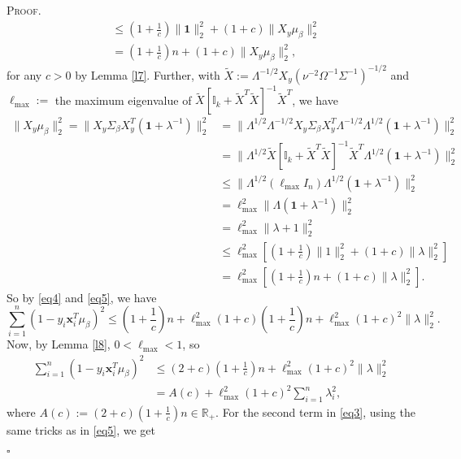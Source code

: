 \documentclass[12pt]{article}
\newcounter{ProofCounter}
\newenvironment{Proof}{\stepcounter{ProofCounter}\textsc{Proof.}}{\hfill$\square$}
\numberwithin{equation}{section}
\begin{document}
\begin{Proof}
\begin{align}
    & \leq \left(1 + \frac{1}{c}\right) \|\mathbf{1}\|_{2}^{2} + \left( 1 + c \right)\|X_{y}\mu_{\beta}\|_{2}^{2} \nonumber \\
    & = \left( 1 + \frac{1}{c} \right) n + (1 + c)\|X_y \mu_\beta \|_2^2,
    \label{eq4}
  \end{align}
  for any $c > 0$ by Lemma \ref{l7}. Further, with $\tilde{X} := \Lambda^{-1/2}X_{y}(\nu^{-2}\Omega^{-1}\Sigma^{-1})^{-1/2}$ and 
  $\ell_{\max} :=$ the maximum eigenvalue of $\tilde{X}[\mathbb{I}_k + \tilde{X}^T \tilde{X}]^{-1} \tilde{X}^T$, we have
  \begin{align}
    \| X_{y} \mu_{\beta}\|_{2}^{2} = \|X_{y}\Sigma_{\beta} X_{y}^T (\bm{1} + \lambda^{-1})\|_{2}^{2} 
    & = \| \Lambda^{1/2}\Lambda^{-1/2} X_{y}\Sigma_{\beta}X_{y}^T \Lambda^{-1/2} \Lambda^{1/2} (\bm{1} + \lambda^{-1})\|_{2}^{2} \nonumber \\
    & = \| \Lambda^{1/2} \tilde{X}[ \mathbb{I}_{k} + \tilde{X}^T \tilde{X} ]^{-1} \tilde{X}^T \Lambda^{1/2} (\mathbf{1} + \lambda^{-1})\|_{2}^{2} \nonumber \\
    & \leq \| \Lambda^{1/2} (\ell_{\max}I_{n}) \Lambda^{1/2}  (\mathbf{1} + \lambda^{-1})\|_{2}^{2} \nonumber \\
    & = \ell_{\max}^2 \| \Lambda (\mathbf{1} + \lambda^{-1})\|_{2}^{2} \nonumber \\
    & = \ell_{\max}^2 \| \lambda + 1\|_{2}^{2} \nonumber \\
    & \leq \ell_{\max}^2 \left[ \left( 1 + \frac{1}{c} \right) \|1\|_{2}^{2} + (1 + c) \|\lambda \|_{2}^{2}\right] \nonumber \\
    & = \ell_{\max}^2 \left[ \left( 1 + \frac{1}{c} \right) n + (1 + c) \|\lambda \|_{2}^{2}\right].
    \label{eq5}
  \end{align}
  So by \eqref{eq4} and \eqref{eq5}, we have 
  \[
    \sum_{i=1}^{n} ( 1 - y_i \bm{x}_i^T \mu_\beta )^2 \leq \left( 1 + \frac{1}{c} \right)n + \ell_{\max}^2(1 + c)\left( 1 + \frac{1}{c}\right) n 
    + \ell_{\max}^2 (1 + c)^2 \|\lambda\|_2^2.
  \]
  Now, by Lemma \ref{l8}, $0 < \ell_{\max} < 1$, so
  \begin{align}
    \sum_{i=1}^{n} ( 1 - y_i \bm{x}_i^T \mu_\beta )^2 & \leq (2 + c)\left( 1 + \frac{1}{c} \right)n + \ell_{\max}^2 (1 + c)^2 \|\lambda\|_2^2
    \nonumber \\
    & = A(c) + \ell_{\max}^2(1 + c)^2 \sum_{i=1}^{n} \lambda_i^2,
    \label{eq6}
  \end{align}
  where $A(c) := (2 + c)\left( 1 + \frac{1}{c} \right) n \in \mathbb{R}_{+}$.
  For the second term in \eqref{eq3}, using the same tricks as in \eqref{eq5}, we get

\end{Proof}
\end{document}

